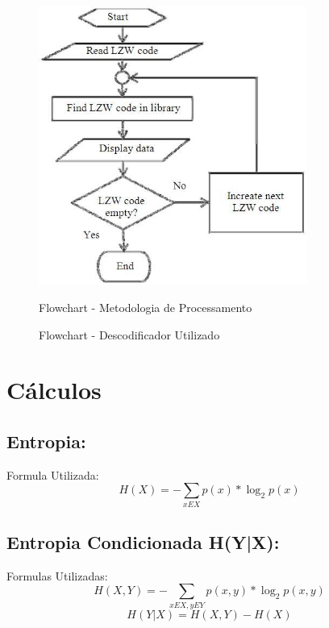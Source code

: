 \documentclass{article}
\begin{document}
\begin{titlepage}
\begin{figure}[!ht]
        \centering
        \includegraphics[width=250pt]{LZW-decoder.png}
        \vspace{1cm}
        \caption{Flowchart - Metodologia de Processamento}
        \caption{Flowchart - Descodificador Utilizado}
    \end{figure}
    
\clearpage

\section{Cálculos}
    \vspace{1cm}\subsection{Entropia:}
        \vspace{0.5cm}\indent Formula Utilizada: \[ H(X) = - \sum_{x E X} p(x) * \log _{2} p(x)\]
        
    \vspace{1cm}\subsection{Entropia Condicionada H(Y|X):}
        \vspace{0.5cm}\indent Formulas Utilizadas: 
        \indent \[ H(X,Y) = - \sum_{x E X, y E Y} p(x,y) * \log _{2} p(x,y)\]
        \vspace{0.5cm}\indent \[ H(Y|X) = H(X,Y) - H(X)\]


\end{titlepage}
\end{document}
